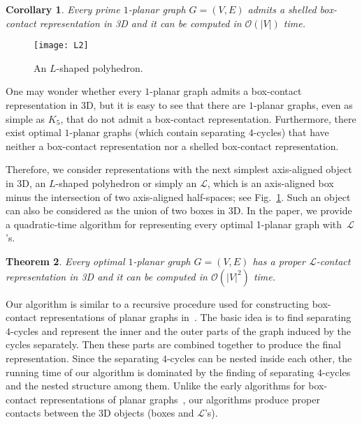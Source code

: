 \documentclass{article}
\newtheorem{theorem}{Theorem}
\newtheorem{corollary}[theorem]{Corollary}
\newcommand{\wormhole}[1]
{
\newcounter{#1}
\setcounter{#1}{\value{theorem}}
}
\newcommand{\LL}{$\mathcal{L}$\xspace}
\newcommand{\LLs}{$\mathcal{L}$'s\xspace}
\newcommand{\Oh}{{\ensuremath{\mathcal{O}}}}
\begin{document}
\wormhole{th-prime}
\begin{corollary}
\label{th:prime}
Every prime $1$-planar graph $G=(V,E)$ admits a shelled box-contact representation
in 3D and it can be computed in $\Oh(|V|)$ time.
\end{corollary}


\begin{figure}
\centering
    \texttt{[image: L2]}
  \caption{An $L$-shaped polyhedron.}
  \label{fig:L}
\end{figure}
One may wonder whether every $1$-planar graph admits a box-contact representation in 3D, but it is easy to see that there are $1$-planar graphs, even as simple as $K_5$, that do not admit a
box-contact representation. Furthermore, there exist optimal $1$-planar graphs (which contain separating $4$-cycles) that have neither a box-contact representation nor a shelled box-contact representation.


Therefore, we consider representations with the next simplest
axis-aligned object in 3D, an $L$-shaped polyhedron
or simply an \LL, which is an axis-aligned box minus the intersection of
two axis-aligned half-spaces; see Fig.~\ref{fig:L}. Such an object can also be
considered as the union of two boxes in 3D. In the paper, we provide a quadratic-time algorithm
for representing every optimal 1-planar graph with~\LLs.

\wormhole{thm-1-planar}
\begin{theorem}
\label{thm:1-planar}
 Every optimal $1$-planar graph $G=(V,E)$ has a proper \LL-contact representation in 3D and it can be computed in $\Oh(|V|^2)$ time.
\end{theorem}

Our algorithm is similar to a recursive procedure used for constructing
box-contact representations of planar graphs in~\cite{FF11,Tho88}. The basic idea is to find
separating $4$-cycles and represent the inner and the outer parts of the graph induced by the cycles
separately. Then these parts are combined together to produce the final representation.
Since the separating $4$-cycles can be nested inside each other, the
running time of our algorithm is dominated by the finding of separating $4$-cycles
and the nested structure among them.
Unlike the early algorithms for box-contact representations of planar graphs~\cite{FF11,Tho88}, our algorithms produce proper contacts between the 3D objects (boxes and \LLs).
\end{document}
